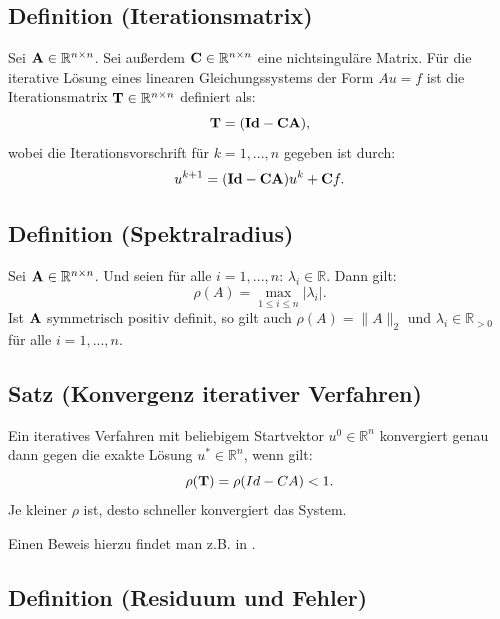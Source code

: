 \subsection{Definition (Iterationsmatrix)}\label{ss.Iterationsmatrix}

Sei ${\textbf{A}} \in \mathbb{R}^{n \times n}$. Sei außerdem ${\textbf{C}} \in \mathbb{R}^{n \times n}$ eine nichtsinguläre Matrix. Für die iterative Lösung eines linearen Gleichungssystems der Form $Au = f$ ist die Iterationsmatrix ${\textbf{T}} \in \mathbb{R}^{n \times n}$ definiert als:
\begin{equation}
{\textbf{T}} = ({\textbf{Id}} - {\textbf{C}} {\textbf{A}}),
\end{equation}
wobei die Iterationsvorschrift für $k=1,...,n$ gegeben ist durch:
\begin{equation}
u^{k+1} = ({\textbf{Id}} - {\textbf{C}} {\textbf{A}})u^{k} + {\textbf{C}} f.\label{eq.Iteratives Verfahren}
\end{equation}

\subsection{Definition (Spektralradius)}\label{s.Spektralradius}

Sei ${\textbf{A}} \in \mathbb{R}^{n \times n}$. Und seien für alle $i=1,...,n$: $\lambda_{i} \in \mathbb{R}$. Dann gilt:
\begin{equation}
\rho(A) = \max_{1 \le i \le n} | \lambda_{i} |.
\end{equation}
Ist ${\textbf{A}}$ symmetrisch positiv definit, so gilt auch $\rho(A) = \| A \|_{2}$ und $\lambda_{i} \in \mathbb{R}_{>0}$ für alle $i=1,...,n$.

\subsection{Satz (Konvergenz iterativer Verfahren)}\label{ss.Konvergenz iterativer Verfahren}

Ein iteratives Verfahren mit beliebigem Startvektor $u^{0} \in \mathbb{R}^{n}$ konvergiert genau dann gegen die exakte Lösung $u^{*} \in \mathbb{R}^{n}$, wenn gilt:
\begin{equation}
\rho({\textbf{T}}) = \rho(Id - CA) < 1.
\end{equation}
Je kleiner $\rho$ ist, desto schneller konvergiert das System.

Einen Beweis hierzu findet man z.B. in \cite{DR5}.

\subsection{Definition (Residuum und Fehler)}\label{ss.Residuum und Fehler}


